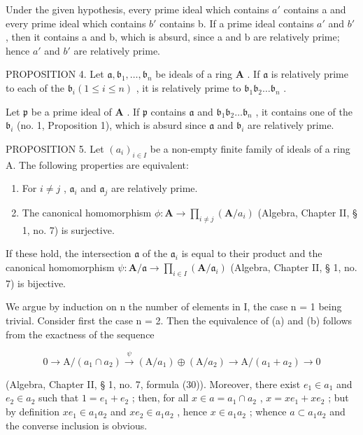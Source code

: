 Under the given hypothesis, every prime ideal which contains \(a'\) contains a and every prime ideal which contains \(b'\) contains b. If a prime ideal contains \(a'\) and \(b'\) , then it contains a and b, which is absurd, since a and b are relatively prime; hence \(a'\) and \(b'\) are relatively prime.

PROPOSITION 4. Let \(\mathfrak{a}, \mathfrak{b}_1, \ldots, \mathfrak{b}_n\) be ideals of a ring \(\mathbf{A}\) . If \(\mathfrak{a}\) is relatively prime to each of the \(\mathfrak{b}_i (1 \leqslant i \leqslant n)\) , it is relatively prime to \(\mathfrak{b}_1\mathfrak{b}_2 \ldots \mathfrak{b}_n\) .

Let \(\mathfrak{p}\) be a prime ideal of \(\mathbf{A}\) . If \(\mathfrak{p}\) contains \(\mathfrak{a}\) and \(\mathfrak{b}_1\mathfrak{b}_2\ldots \mathfrak{b}_n\) , it contains one of the \(\mathfrak{b}_i\) (no. 1, Proposition 1), which is absurd since \(\mathfrak{a}\) and \(\mathfrak{b}_i\) are relatively prime.

PROPOSITION 5. Let \((a_{i})_{i\in I}\) be a non-empty finite family of ideals of a ring A. The following properties are equivalent:

\begin{enumerate}
\def\labelenumi{(\alph{enumi})}
\item
  For \(i \neq j\) , \(\mathfrak{a}_i\) and \(\mathfrak{a}_j\) are relatively prime.
\item
  The canonical homomorphism \(\phi: \mathbf{A} \to \prod_{i \neq j} (\mathbf{A} / a_i)\) (Algebra, Chapter II, § 1, no. 7) is surjective.
\end{enumerate}

If these hold, the intersection \(\mathfrak{a}\) of the \(\mathfrak{a}_i\) is equal to their product and the canonical homomorphism \(\psi: \mathbf{A} / \mathfrak{a} \to \prod_{i \in I} (\mathbf{A} / \mathfrak{a}_i)\) (Algebra, Chapter II, § 1, no. 7) is bijective.

We argue by induction on n the number of elements in I, the case n = 1 being trivial. Consider first the case n = 2. Then the equivalence of (a) and (b) follows from the exactness of the sequence

\[
0 \longrightarrow \mathrm{A} / (a _ {1} \cap a _ {2}) \stackrel {\psi} {\longrightarrow} (\mathrm{A} / a _ {1}) \oplus (\mathrm{A} / a _ {2}) \longrightarrow \mathrm{A} / (a _ {1} + a _ {2}) \longrightarrow 0
\]

(Algebra, Chapter II, § 1, no. 7, formula (30)). Moreover, there exist \(e_1 \in a_1\) and \(e_2 \in a_2\) such that \(1 = e_1 + e_2\) ; then, for all \(x \in a = a_1 \cap a_2\) , \(x = xe_1 + xe_2\) ; but by definition \(xe_1 \in a_1a_2\) and \(xe_2 \in a_1a_2\) , hence \(x \in a_1a_2\) ; whence \(a \subset a_1a_2\) and the converse inclusion is obvious.

